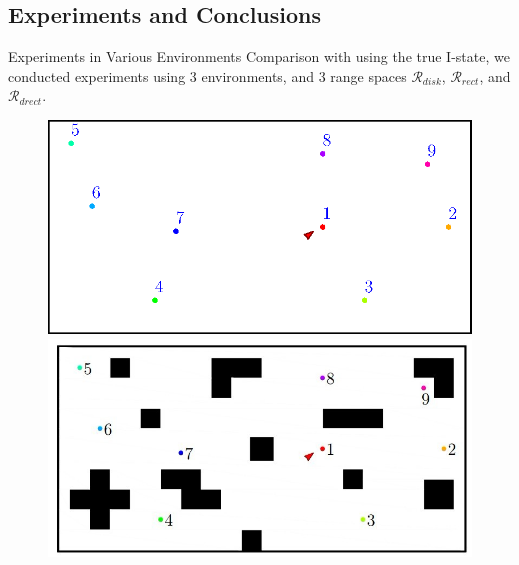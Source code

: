 \documentclass[10pt]{beamer}
\begin{document}

\subsection[Experiments]{Experiments and Conclusions}
\begin{frame}{Experiments in Various Environments}
  Comparison with using the true I-state, we conducted experiments using 3
  environments, and 3 range spaces $\mathcal{R}_{disk}$, $\mathcal{R}_{rect}$,
  and  $\mathcal{R}_{drect}$. \\
  \begin{figure}
  \centering
  \begin{minipage}[b]{0.45\textwidth}
    \includegraphics[scale=0.45]{figs/blank}  \\ 
    \includegraphics[scale=0.45]{figs/clutter}  
  \end{minipage}
  \begin{minipage}[b]{0.45\textwidth}

\end{minipage}
\end{figure}
\end{frame}
\end{document}

